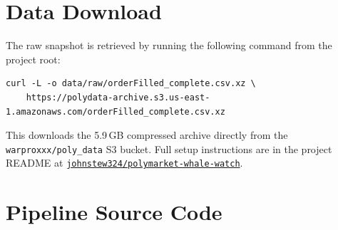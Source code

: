 \documentclass[11pt]{article}
\begin{document}
\newpage
\appendix

\section{Data Download}
\label{app:download}

The raw snapshot is retrieved by running the following command from the
project root:

\begin{verbatim}
curl -L -o data/raw/orderFilled_complete.csv.xz \
    https://polydata-archive.s3.us-east-1.amazonaws.com/orderFilled_complete.csv.xz
\end{verbatim}

\noindent This downloads the 5.9\,GB compressed archive directly from
the \texttt{warproxxx/poly\_data} S3 bucket. Full setup instructions
are in the project README at
\href{https://github.com/johnstew324/polymarket-whale-watch}{%
\faGithub\;\texttt{johnstew324/polymarket-whale-watch}}.


\section{Pipeline Source Code}
\label{app:code}

\end{document}

